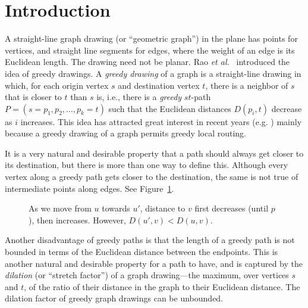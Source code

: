 \documentclass[11pt]{article}
\newcommand{\etal}{{\em et al.~}}
\begin{document}
\section{Introduction}
A straight-line graph drawing (or ``geometric graph'') in the plane has points for vertices, and straight line segments for edges, where the weight of an edge is its Euclidean length.  The drawing need not be planar.
Rao \etal\cite{Rao:GeoRouting:2003} introduced the idea of greedy drawings.  A \emph{greedy drawing} of a graph is a straight-line drawing in which, for each origin vertex $s$ and destination vertex $t$, there is a neighbor of $s$ that is closer to $t$ than $s$ is, i.e., there is a \emph{greedy} $st$-path $P=(s=p_1,p_2,\ldots,p_k = t)$ such that the Euclidean distances $D(p_i, t)$ decrease as $i$ increases.
This idea has attracted great interest in recent years (e.g. \cite{Angelini:2009,Bose:theta6:2012,Goodrich:2008,He:2011,Leighton:2010,Papadimitriou:2005}) mainly because a greedy drawing of a graph permits greedy local routing.


It is a very natural and desirable property that a path should always get closer to its destination, but there is more than one way to define this.
Although every vertex along a greedy path gets closer to the destination, the same is not true of intermediate points along edges.
See Figure~\ref{fig:greedy-vs-SA}.


\begin{figure}
\centering


\caption{As we move from $u$ towards $u'$, distance to $v$ first decreases (until $p$), then increases. However, $D(u', v) < D(u, v)$.}
\label{fig:greedy-vs-SA}
\end{figure}



Another disadvantage of greedy paths is that the
length of a greedy path is not bounded in terms of the Euclidean distance between the endpoints.
This is another natural and desirable property for a path to have, and is captured by the
\emph{dilation} (or ``stretch factor'') of a graph drawing---the maximum, over vertices $s$ and $t$, of the ratio of their distance in the graph to their Euclidean distance.
The dilation factor of greedy graph drawings can be unbounded.
\end{document}
